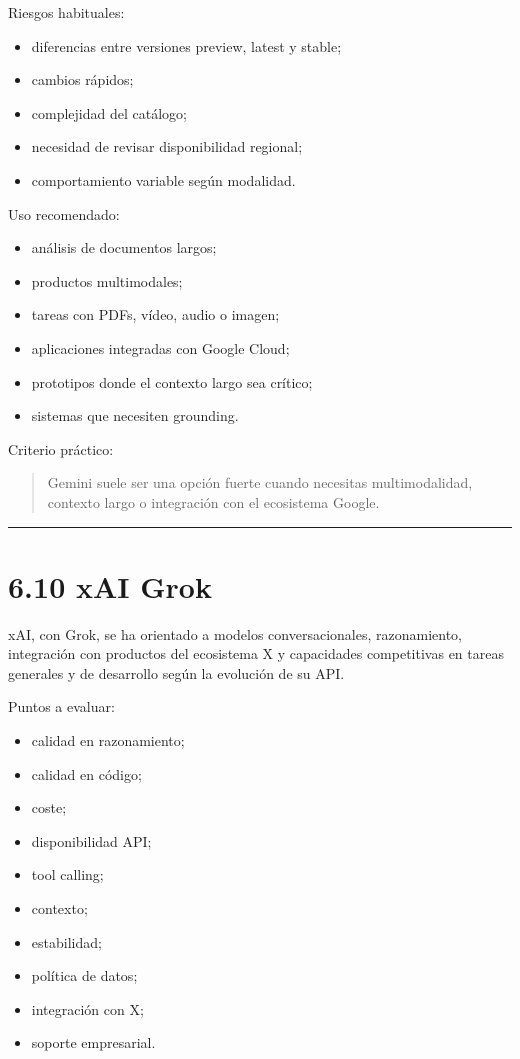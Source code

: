 Riesgos habituales:

\begin{itemize}
\tightlist
\item
  diferencias entre versiones preview, latest y stable;
\item
  cambios rápidos;
\item
  complejidad del catálogo;
\item
  necesidad de revisar disponibilidad regional;
\item
  comportamiento variable según modalidad.
\end{itemize}

Uso recomendado:

\begin{itemize}
\tightlist
\item
  análisis de documentos largos;
\item
  productos multimodales;
\item
  tareas con PDFs, vídeo, audio o imagen;
\item
  aplicaciones integradas con Google Cloud;
\item
  prototipos donde el contexto largo sea crítico;
\item
  sistemas que necesiten grounding.
\end{itemize}

Criterio práctico:

\begin{quote}
Gemini suele ser una opción fuerte cuando necesitas multimodalidad,
contexto largo o integración con el ecosistema Google.
\end{quote}

\begin{center}\rule{0.5\linewidth}{0.5pt}\end{center}

\section{6.10 xAI Grok}\label{xai-grok}

xAI, con Grok, se ha orientado a modelos conversacionales, razonamiento,
integración con productos del ecosistema X y capacidades competitivas en
tareas generales y de desarrollo según la evolución de su API.

Puntos a evaluar:

\begin{itemize}
\tightlist
\item
  calidad en razonamiento;
\item
  calidad en código;
\item
  coste;
\item
  disponibilidad API;
\item
  tool calling;
\item
  contexto;
\item
  estabilidad;
\item
  política de datos;
\item
  integración con X;
\item
  soporte empresarial.
\end{itemize}

